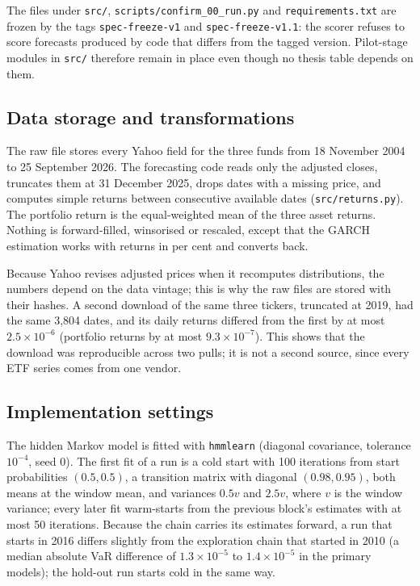The files under \texttt{src/}, \texttt{scripts/confirm\_00\_run.py} and \texttt{requirements.txt} are frozen by the tags \texttt{spec-freeze-v1} and \texttt{spec-freeze-v1.1}: the scorer refuses to score forecasts produced by code that differs from the tagged version. Pilot-stage modules in \texttt{src/} therefore remain in place even though no thesis table depends on them.

\subsection{Data storage and transformations}\label{sec:code-data}

The raw file stores every Yahoo field for the three funds from 18 November 2004 to 25 September 2026. The forecasting code reads only the adjusted closes, truncates them at 31 December 2025, drops dates with a missing price, and computes simple returns between consecutive available dates (\texttt{src/returns.py}). The portfolio return is the equal-weighted mean of the three asset returns. Nothing is forward-filled, winsorised or rescaled, except that the GARCH estimation works with returns in per cent and converts back.

Because Yahoo revises adjusted prices when it recomputes distributions, the numbers depend on the data vintage; this is why the raw files are stored with their hashes. A second download of the same three tickers, truncated at 2019, had the same 3,804 dates, and its daily returns differed from the first by at most $2.5\times10^{-6}$ (portfolio returns by at most $9.3\times10^{-7}$). This shows that the download was reproducible across two pulls; it is not a second source, since every ETF series comes from one vendor.

\subsection{Implementation settings}\label{sec:code-settings}

The hidden Markov model is fitted with \texttt{hmmlearn} (diagonal covariance, tolerance $10^{-4}$, seed 0). The first fit of a run is a cold start with 100 iterations from start probabilities $(0.5,0.5)$, a transition matrix with diagonal $(0.98,0.95)$, both means at the window mean, and variances $0.5v$ and $2.5v$, where $v$ is the window variance; every later fit warm-starts from the previous block's estimates with at most 50 iterations. Because the chain carries its estimates forward, a run that starts in 2016 differs slightly from the exploration chain that started in 2010 (a median absolute VaR difference of $1.3\times10^{-5}$ to $1.4\times10^{-5}$ in the primary models); the hold-out run starts cold in the same way.

